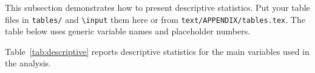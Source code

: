 
This subsection demonstrates how to present descriptive statistics. Put your
table files in \texttt{tables/} and \texttt{\textbackslash input} them here
or from \texttt{text/APPENDIX/tables.tex}. The table below uses generic
variable names and placeholder numbers.

Table~\ref{tab:descriptive} reports descriptive statistics for the main
variables used in the analysis.


